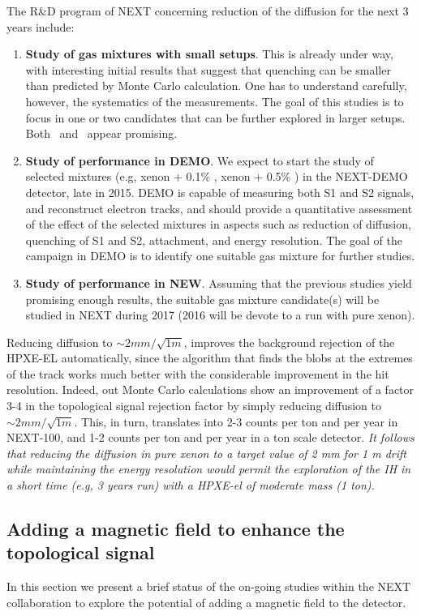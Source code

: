 The R\&D program of NEXT concerning reduction of the diffusion for the next 3 years include:
 \begin{enumerate}
\item {\bf Study of gas mixtures with small setups}. This is already under way, with interesting initial results that suggest that quenching can be smaller than predicted by Monte Carlo calculation. One has to understand carefully, however, the systematics of the measurements. The goal of this studies is to focus in one or two candidates that can be further explored in larger setups. Both \COT\ and \CHF\ appear promising. 
\item {\bf Study of performance in DEMO}. We expect to start the study of selected mixtures (e.g, xenon + 0.1\% \COT, xenon + 0.5\% \CHF) in the NEXT-DEMO detector, late in 2015. DEMO is capable of measuring both S1 and S2 signals, and reconstruct electron tracks, and should provide a quantitative assessment of the effect of the selected mixtures in aspects such as reduction of diffusion, quenching of S1 and S2, attachment, and energy resolution. The goal of the campaign in DEMO is to identify one suitable gas mixture for further studies.
\item {\bf Study of performance in NEW}. Assuming that the previous studies yield promising enough results, the suitable gas mixture candidate(s) will be studied in NEXT during 2017 (2016 will be devote to a run with pure xenon). 
\end{enumerate}

Reducing diffusion to $\sim 2 mm/\sqrt{1 m}$, improves the background rejection of the
HPXE-EL automatically, since the algorithm that finds the blobs at the extremes of the track works much better with the considerable improvement in the hit resolution. Indeed, out Monte Carlo calculations show an improvement of a factor 3-4 in the topological signal rejection factor by simply reducing diffusion to  $\sim 2 mm/\sqrt{1 m}$. This, in turn, translates into 2-3 counts per ton and per year in NEXT-100, and 1-2 counts per ton and per year in a ton scale detector. 
{\em It follows that reducing the diffusion in pure xenon to a target value of 2 mm for 1 m drift while maintaining the energy resolution would permit the exploration of the IH in a short time (e.g, 3 years run) with a HPXE-el of moderate mass (1 ton).}  


\subsection{Adding a magnetic field to enhance the topological signal}
In this section we present a brief status of the on-going studies within the NEXT collaboration to explore the potential of adding a magnetic field to the detector. 

